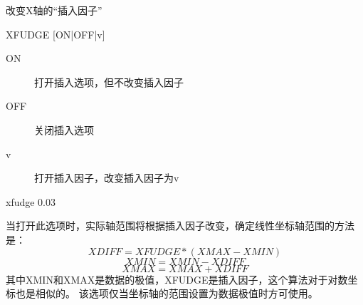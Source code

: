 \label{cmd:xfudge}

改变X轴的``插入因子''

\begin{SACSTX}
XFUDGE [ON|OFF|v]
\end{SACSTX}

\begin{description}
\item [ON] 打开插入选项，但不改变插入因子
\item [OFF] 关闭插入选项
\item [v] 打开插入因子，改变插入因子为v
\end{description}

\begin{SACDFT}
xfudge 0.03
\end{SACDFT}

当打开此选项时，实际轴范围将根据插入因子改变，确定线性坐标轴范围的方法是：
\[ XDIFF=XFUDGE*(XMAX-XMIN) \]
\[ XMIN=XMIN-XDIFF \]
\[ XMAX=XMAX+XDIFF \]
其中XMIN和XMAX是数据的极值，XFUDGE是插入因子，这个算法对于对数坐标也是相似的。
该选项仅当坐标轴的范围设置为数据极值时方可使用。
